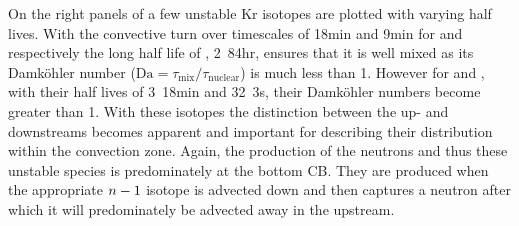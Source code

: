 \documentclass[fleqn,usenatbib]{mnras}
\begin{document}
On the right panels of  a few unstable Kr isotopes are plotted with
varying half lives. With the convective turn over timescales of \unit{18}{min}
and \unit{9}{min} for  and  respectively the long half life
of , \unit{2.84}{hr}, ensures that it is well mixed as its
Damk\"ohler number ($\mathrm{Da} = \tau_{\mathrm{mix}} /
\tau_{\mathrm{nuclear}}$) is much less than 1. However for  and
, with their half lives of \unit{3.18}{min} and \unit{32.3}{s},
their Damk\"ohler numbers become greater than 1. With these isotopes the
distinction between the up- and downstreams becomes apparent and important for
describing their distribution within the convection zone. Again, the production
of the neutrons and thus these unstable species is predominately at the bottom
CB. They are produced when the appropriate $n - 1$ isotope is advected down
and then captures a neutron after which it will predominately be advected away
in the upstream.
\end{document}
